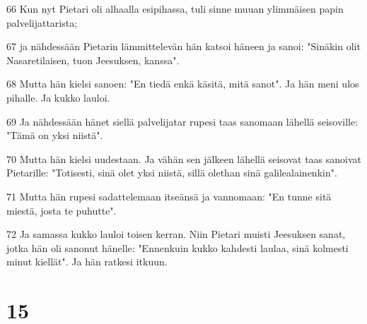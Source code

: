 \par 66 Kun nyt Pietari oli alhaalla esipihassa, tuli sinne muuan ylimmäisen papin palvelijattarista;
\par 67 ja nähdessään Pietarin lämmittelevän hän katsoi häneen ja sanoi: "Sinäkin olit Nasaretilaisen, tuon Jeesuksen, kanssa".
\par 68 Mutta hän kielsi sanoen: "En tiedä enkä käsitä, mitä sanot". Ja hän meni ulos pihalle. Ja kukko lauloi.
\par 69 Ja nähdessään hänet siellä palvelijatar rupesi taas sanomaan lähellä seisoville: "Tämä on yksi niistä".
\par 70 Mutta hän kielsi uudestaan. Ja vähän sen jälkeen lähellä seisovat taas sanoivat Pietarille: "Totisesti, sinä olet yksi niistä, sillä olethan sinä galilealainenkin".
\par 71 Mutta hän rupesi sadattelemaan itseänsä ja vannomaan: "En tunne sitä miestä, josta te puhutte".
\par 72 Ja samassa kukko lauloi toisen kerran. Niin Pietari muisti Jeesuksen sanat, jotka hän oli sanonut hänelle: "Ennenkuin kukko kahdesti laulaa, sinä kolmesti minut kiellät". Ja hän ratkesi itkuun.

\chapter{15}

